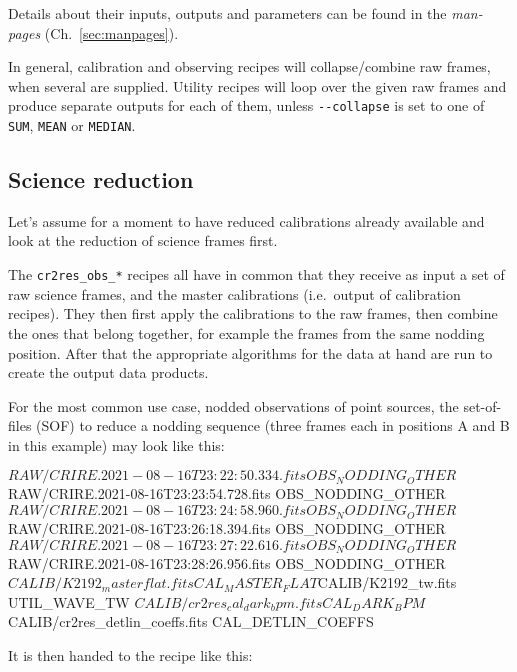 Details about their inputs, outputs and parameters can be found in the
\emph{man-pages} (Ch.~\ref{sec:manpages}).

In general, calibration and observing recipes will collapse/combine raw frames,
when several are supplied. Utility recipes will loop over the given raw frames
and produce separate outputs for each of them, unless \verb!--collapse! is
set to one of \verb!SUM!, \verb!MEAN! or \verb!MEDIAN!.




\subsection{Science reduction}
\label{sec:sci-reduc}
Let's assume for a moment to have reduced calibrations already available
and look at the reduction of science frames first.

The \texttt{cr2res\_obs\_*} recipes all have in common that they receive as
input a set of raw science frames, and the master calibrations (i.e.~output of
calibration recipes). They then first apply the calibrations to the raw frames,
then combine the ones that belong together, for example the frames from the same
nodding position. After that the appropriate algorithms for the data at hand are
run to create the output data products.

For the most common use case, nodded observations of point sources, the
set-of-files (SOF) to reduce a nodding sequence (three frames each in positions
A and B in this example) may look like this:
\begin{shell}[fontsize=\small]
$RAW/CRIRE.2021-08-16T23:22:50.334.fits OBS_NODDING_OTHER
$RAW/CRIRE.2021-08-16T23:23:54.728.fits OBS_NODDING_OTHER
$RAW/CRIRE.2021-08-16T23:24:58.960.fits OBS_NODDING_OTHER
$RAW/CRIRE.2021-08-16T23:26:18.394.fits OBS_NODDING_OTHER
$RAW/CRIRE.2021-08-16T23:27:22.616.fits OBS_NODDING_OTHER
$RAW/CRIRE.2021-08-16T23:28:26.956.fits OBS_NODDING_OTHER
$CALIB/K2192_masterflat.fits           CAL_MASTER_FLAT
$CALIB/K2192_tw.fits                   UTIL_WAVE_TW
$CALIB/cr2res_cal_dark_bpm.fits        CAL_DARK_BPM
$CALIB/cr2res_detlin_coeffs.fits       CAL_DETLIN_COEFFS
\end{shell}

It is then handed to the recipe like this:
\begin{shell}[fontsize=\small]
\end{shell}

